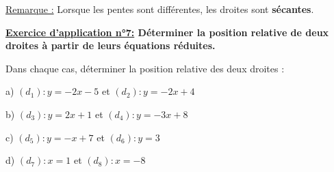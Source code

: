 \documentclass[12pt]{article}
\begin{document}
\underline{Remarque :} Lorsque les pentes sont différentes, les droites sont \textbf{sécantes}.

\vspace{5pt}
\begin{mdframed}[
    linewidth=1pt,
    roundcorner=5pt,
    linecolor=RoyalBlue,
    innertopmargin=10pt,
    innerbottommargin=10pt
]
{\color{RoyalBlue}
\textbf{\underline{Exercice d'application n°7:} Déterminer la position relative de deux droites à partir 
de leurs équations réduites.}}

\vspace{5pt}
Dans chaque cas, déterminer la position relative des deux droites :

\vspace{5pt}
\hspace{1cm}a) $(d_1) : y = -2x - 5$ et $(d_2) : y = -2x + 4$

\vspace{5pt}
\hspace{1cm}b) $(d_3) : y = 2x + 1$ et $(d_4) : y = -3x + 8$

\vspace{5pt}
\hspace{1cm}c) $(d_5) : y = -x + 7$ et $(d_6) : y = 3$

\vspace{5pt}
\hspace{1cm}d) $(d_7) : x = 1$ et $(d_8) : x = -8$

\vspace{0.5cm}
{\color{black!30}\dotfill}

\vspace{0.5cm}
{\color{black!30}\dotfill}

\vspace{0.5cm}
{\color{black!30}\dotfill}

\vspace{0.5cm}
{\color{black!30}\dotfill}

\vspace{0.5cm}
{\color{black!30}\dotfill}

\vspace{20pt}

\end{mdframed}

\vspace{20pt}

\end{document}
